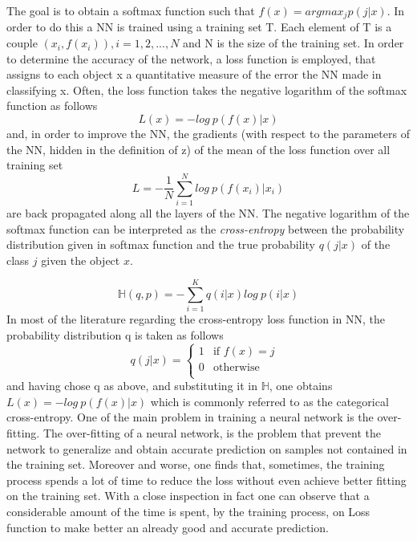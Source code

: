 \documentclass{report}
\begin{document}
The goal is to obtain a softmax function such that $f(x)=argmax_jp(j|x)$.
In order to do this a NN is trained using a training set T. Each element of T is a couple $(x_i,f(x_i)), i=1,2,...,N$ and N is the size of the training set. In order to determine the accuracy of the network, a loss function is employed, that assigns to each object x a quantitative measure of the error the NN made in
classifying x. Often, the loss function takes the negative logarithm of the softmax function as follows
\[
L(x)=-log\ p(f(x)|x)
\]
and, in order to improve the NN, the gradients (with respect to the parameters of the NN, hidden in the definition of z) of the mean of the loss function over all training set
\[
L = -\dfrac{1}{N}\sum_{i=1}^{N} log\ p(f(x_i)|x_i) 
\]
are back propagated along all the layers of the NN. The negative logarithm of the softmax function can be interpreted as the \textit{cross-entropy} between the probability
distribution given in softmax function and the true probability $q(j|x)$ of the class $j$ given the object $x$.

\[
\mathbb{H}(q,p) = - \sum_{i=1}^{K} q(i|x) log\ p(i|x) 
\]
In most of the literature regarding the cross-entropy loss function in NN, the
probability distribution q is taken as follows
\begin{equation}
q(j|x)= 
\begin{cases}
1 & \text{if $f(x)=j$ }\\
0 &\text{otherwise}\\
\end{cases}
\end{equation}
and having chose q as above, and substituting it in $\mathbb{H}$, one obtains \\ $L(x)=-log\ p(f(x)|x)$  which
is commonly referred to as the categorical cross-entropy. One of the main problem in training a neural network is the over-fitting. The
over-fitting of a neural network, is the problem that prevent the network to generalize
and obtain accurate prediction on samples not contained in the training set. Moreover and worse, one finds that, sometimes, the training process spends a
lot of time to reduce the loss without even achieve better fitting on the training
set. With a close inspection in fact one can observe that a considerable amount
of the time is spent, by the training process, on Loss function to make better an already good and accurate prediction.
\end{document}

